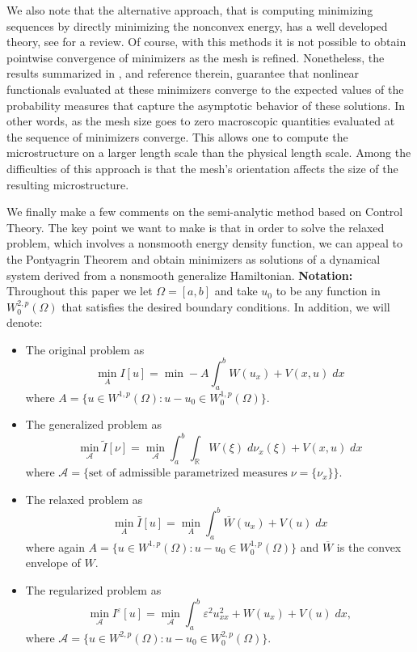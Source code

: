 \documentclass[11pt]{article}
\newcommand{\eps}{\varepsilon}
\newcommand{\R}{\mathbb{R}}
\theoremstyle{plain}
\begin{document}
We also note that the alternative approach, that is computing minimizing sequences by directly minimizing the nonconvex energy, has a well developed theory, see \cite{luskin1996} for a review. Of course, with this methods it is not possible to obtain pointwise convergence of minimizers as the mesh is refined. Nonetheless, the results summarized in \cite{luskin1996, luskin1992}, and reference therein, guarantee that nonlinear functionals evaluated at these minimizers converge to the expected values of the probability measures that capture the asymptotic behavior of these solutions. In other words, as the mesh size goes to zero macroscopic quantities evaluated at the sequence of minimizers converge. This allows one to compute the microstructure on a larger length scale than the physical length scale. Among the difficulties of this approach is that the mesh's orientation affects the size of the resulting microstructure. 

We finally make a few comments on the semi-analytic method based on Control Theory. The key point we want to make is that in order to solve the relaxed problem, which involves a nonsmooth energy density function, we can appeal to the Pontyagrin Theorem and obtain minimizers as solutions of a dynamical system derived from a nonsmooth generalize Hamiltonian.
{\bf Notation:}
Throughout this paper we let $\Omega =[a,b]$ and take $u_0$ to be any function in $W_0^{2,p}(\Omega)$  that satisfies the desired boundary conditions. In addition, we will denote:
\begin{itemize}
\item The original problem as
\begin{equation}\label{e:original}
 \min_{A} I[u] = \min-A \int_a^b W(u_x) + V(x,u) \;dx
 \end{equation}
where $ A=\{ u \in W^{1,p}(\Omega) : u-u_0 \in W_0^{1,p}(\Omega)\}$.

\item The generalized problem as
\begin{equation}\label{e:generalized}
 \min_{\mathscr{A}} \tilde{I}[\nu] = \min_{\mathscr{A}} \int_a^b \int_\R W(\xi) \;d\nu_x(\xi)  + V(x,u) \;dx
 \end{equation}
where $\mathscr{A} = \{\mbox{set of admissible parametrized measures}\; \nu=\{\nu_x\} \}$.

 \item The relaxed problem as
\begin{equation}\label{e:relaxation}
 \min_{A} \bar{I}[u]  =\min_A \int_a^b \overline{W}(u_x) + V(u) \;dx 
 \end{equation}
where again $A=\{ u \in W^{1,p}(\Omega) : u-u_0 \in W_0^{1,p}(\Omega)\}$ and $\overline{W}$ is the convex envelope of $W$.
\item The regularized problem as
\begin{equation}\label{e:regularized}
 \min_{\mathcal{A}} I^\eps[u]= \min_\mathcal{A} \int_a^b \eps^2u_{xx}^2 + W(u_x) + V(u) \;dx,
 \end{equation}
where $\mathcal{A}= \{ u \in W^{2,p}(\Omega): u-u_0 \in W_0^{2,p}(\Omega)\}$.

\end{itemize}
\end{document}
